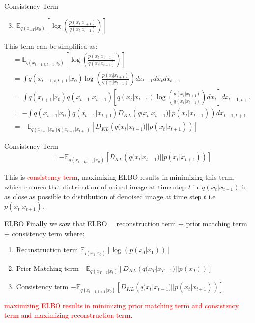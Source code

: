 \begin{frame}{Consistency Term}
    \begin{enumerate}
        \setcounter{enumi}{2}
        \item $\mathbb{E}_{q(x_{1:T}|x_0)} \left[ \log \left( \frac{p(x_{t}|x_{t+1})}{q(x_t|x_{t-1})} \right) \right]$
    \end{enumerate}

    This term can be simplified as:
    \begin{align*}
        &= \mathbb{E}_{q(x_{t-1,t,t+1}|x_{0})} \left[ \log \left( \frac{p(x_{t}|x_{t+1})}{q(x_t|x_{t-1})} \right) \right] \\
        &= \int q(x_{t-1,t,t+1}|x_{0}) \log \left( \frac{p(x_{t}|x_{t+1})}{q(x_t|x_{t-1})} \right) dx_{t-1} dx_t dx_{t+1} \\
        &= \int q(x_{t+1}|x_{0}) q(x_{t-1}|x_{t+1}) \left[ q(x_{t}|x_{t-1}) \log \left( \frac{p(x_{t}|x_{t+1})}{q(x_t|x_{t-1})} \right) dx_t \right] dx_{t-1,t+1} \\
        &= -\int q(x_{t+1}|x_{0}) q(x_{t-1}|x_{t+1}) D_{KL} \left( q(x_t|x_{t-1}) || p(x_t|x_{t+1}) \right) dx_{t-1,t+1} \\
        &= -\mathbb{E}_{q(x_{t+1}|x_{0}) q(x_{t-1}|x_{t+1})} \left[ D_{KL} \left( q(x_t|x_{t-1}) || p(x_t|x_{t+1}) \right) \right]
    \end{align*}
\end{frame}

\begin{frame}{Consistency Term}
    \begin{align*}
        &= -\mathbb{E}_{q(x_{t-1,t+1}|x_{0})} \left[ D_{KL} \left( q(x_t|x_{t-1}) || p(x_t|x_{t+1}) \right) \right]
    \end{align*}

    This is \textcolor{red}{consistency term}, maximizing ELBO results in minimizing this term, which ensures that distribution of noised image at time step $t$ i.e $q(x_t|x_{t-1})$ is as close as possible to distribution of denoised image at time step $t$ i.e $p(x_t|x_{t+1})$.
    
\end{frame}

\begin{frame}{ELBO}
    Finally we saw that ELBO = reconstruction term + prior matching term + consistency term where:
    \begin{enumerate}
        \item Reconstruction term $\mathbb{E}_{q(x_{1}|x_0)} \left[ \log \left( p(x_0|x_1) \right) \right]$
        \item Prior Matching term $-\mathbb{E}_{q(x_{T-1}|x_{0})} \left[ D_{KL} \left( q(x_T|x_{T-1}) || p(x_T) \right) \right]$
        \item Consistency term $-\mathbb{E}_{q(x_{t-1,t+1}|x_{0})} \left[ D_{KL} \left( q(x_t|x_{t-1}) || p(x_t|x_{t+1}) \right) \right]$
    \end{enumerate}
    \bigskip
    \textcolor{red}{maximizing ELBO results in minimizing prior matching term and consistency term and maximizing reconstruction term.}
\end{frame}